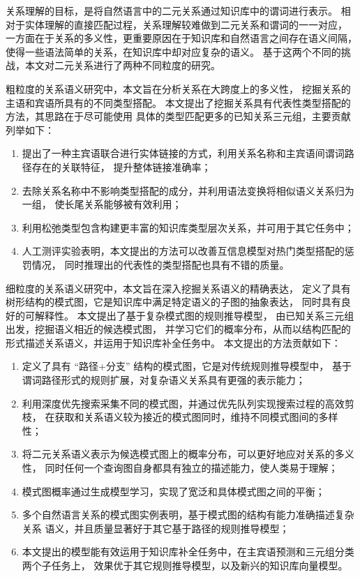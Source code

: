 关系理解的目标，是将自然语言中的二元关系通过知识库中的谓词进行表示。
相对于实体理解的直接匹配过程，关系理解较难做到二元关系和谓词的一一对应，
一方面在于关系的多义性，更重要原因在于知识库和自然语言之间存在语义间隔，
使得一些语法简单的关系，在知识库中却对应复杂的语义。
基于这两个不同的挑战，本文对二元关系进行了两种不同粒度的研究。

粗粒度的关系语义研究中，本文旨在分析关系在大跨度上的多义性，
挖掘关系的主语和宾语所具有的不同类型搭配。
本文提出了挖掘关系具有代表性类型搭配的方法，其思路在于尽可能使用
具体的类型匹配更多的已知关系三元组，主要贡献列举如下：
\begin{enumerate}
\item{提出了一种主宾语联合进行实体链接的方式，利用关系名称和主宾语间谓词路径存在的关联特征，
提升整体链接准确率；}
\item{去除关系名称中不影响类型搭配的成分，并利用语法变换将相似语义关系归为一组，
使长尾关系能够被有效利用；}
\item{利用松弛类型包含构建更丰富的知识库类型层次关系，并可用于其它任务中；}
\item{人工测评实验表明，本文提出的方法可以改善互信息模型对热门类型搭配的惩罚情况，
同时推理出的代表性的类型搭配也具有不错的质量。}
\end{enumerate}

细粒度的关系语义研究中，本文旨在深入挖掘关系语义的精确表达，
定义了具有树形结构的模式图，它是知识库中满足特定语义的子图的抽象表达，
同时具有良好的可解释性。
本文提出了基于复杂模式图的规则推导模型，
由已知关系三元组出发，挖掘语义相近的候选模式图，
并学习它们的概率分布，从而以结构匹配的形式描述关系语义，并运用于知识库补全任务中。
本文提出的方法贡献如下：
\begin{enumerate}
\item{定义了具有 ``{路径+分支}'' 结构的模式图，它是对传统规则推导模型中，
基于谓词路径形式的规则扩展，对复杂语义关系具有更强的表示能力；}
\item{利用深度优先搜索采集不同的模式图，并通过优先队列实现搜索过程的高效剪枝，
在获取和关系语义较为接近的模式图同时，维持不同模式图间的多样性；}
\item{将二元关系语义表示为候选模式图上的概率分布，可以更好地应对关系的多义性，
同时任何一个查询图自身都具有独立的描述能力，使人类易于理解；}
\item{模式图概率通过生成模型学习，实现了宽泛和具体模式图之间的平衡；}
\item{多个自然语言关系的模式图实例表明，基于模式图的结构有能力准确描述复杂关系
语义，并且质量显著好于其它基于路径的规则推导模型；}
\item{本文提出的模型能有效运用于知识库补全任务中，在主宾语预测和三元组分类两个子任务上，
效果优于其它规则推导模型，以及新兴的知识库向量模型。}
\end{enumerate}


